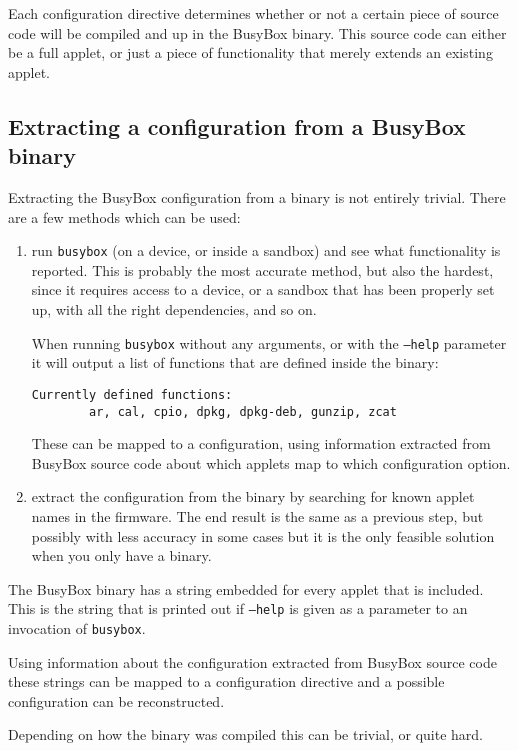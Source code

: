 \documentclass[10pt]{article}
\begin{document}
Each configuration directive determines whether or not a certain piece of
source code will be compiled and up in the BusyBox binary. This source code can
either be a full applet, or just a piece of functionality that merely extends
an existing applet.

\subsection{Extracting a configuration from a BusyBox binary}

Extracting the BusyBox configuration from a binary is not entirely trivial.
There are a few methods which can be used:

\begin{enumerate}
\item run \texttt{busybox} (on a device, or inside a sandbox) and see what
functionality is reported. This is probably the most accurate method, but also
the hardest, since it requires access to a device, or a sandbox that has been
properly set up, with all the right dependencies, and so on.

When running \texttt{busybox} without any arguments, or with the \texttt{--help}
parameter it will output a list of functions that are defined inside the
binary:

\begin{verbatim}
Currently defined functions:
        ar, cal, cpio, dpkg, dpkg-deb, gunzip, zcat
\end{verbatim}

These can be mapped to a configuration, using information extracted from
BusyBox source code about which applets map to which configuration option.
\item extract the configuration from the binary by searching for known applet
names in the firmware. The end result is the same as a previous step, but
possibly with less accuracy in some cases but it is the only feasible solution
when you only have a binary.
\end{enumerate}

The BusyBox binary has a string embedded for every applet that is included.
This is the string that is printed out if \texttt{--help} is given as a
parameter to an invocation of \texttt{busybox}.

Using information about the configuration extracted from BusyBox source code
these strings can be mapped to a configuration directive and a possible
configuration can be reconstructed.

Depending on how the binary was compiled this can be trivial, or quite hard.
\end{document}
